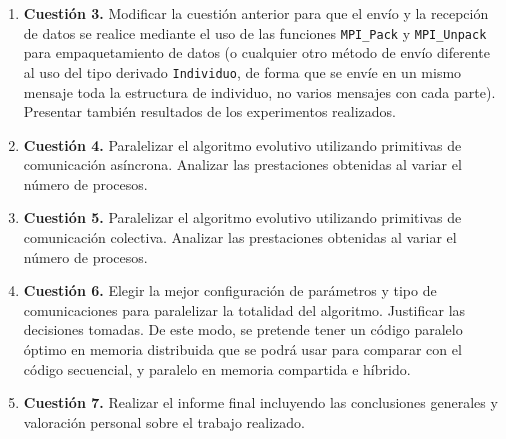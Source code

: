 \documentclass[12pt]{article}
\begin{document}
\begin{enumerate}
Por tanto, en esta máquina los valores más razonables son 2 o 4 procesos.
\newpage
\item \textbf{Cuestión 3.} Modificar la cuestión anterior para que el envío y la recepción de datos se realice mediante el uso de las funciones \texttt{MPI\_Pack} y \texttt{MPI\_Unpack} para empaquetamiento de datos (o cualquier otro método de envío diferente al uso del tipo derivado \texttt{Individuo}, de forma que se envíe en un mismo mensaje toda la estructura de individuo, no varios mensajes con cada parte). Presentar también resultados de los experimentos realizados.



\newpage
\item \textbf{Cuestión 4.} Paralelizar el algoritmo evolutivo utilizando primitivas de comunicación asíncrona. Analizar las prestaciones obtenidas al variar el número de procesos.



\newpage
\item \textbf{Cuestión 5.} Paralelizar el algoritmo evolutivo utilizando primitivas de comunicación colectiva. Analizar las prestaciones obtenidas al variar el número de procesos.



\newpage
\item \textbf{Cuestión 6.} Elegir la mejor configuración de parámetros y tipo de comunicaciones para paralelizar la totalidad del algoritmo. Justificar las decisiones tomadas. De este modo, se pretende tener un código paralelo óptimo en memoria distribuida que se podrá usar para comparar con el código secuencial, y paralelo en memoria compartida e híbrido.



\newpage
\item \textbf{Cuestión 7.} Realizar el informe final incluyendo las conclusiones generales y valoración personal sobre el trabajo realizado.



\end{enumerate}
\end{document}
